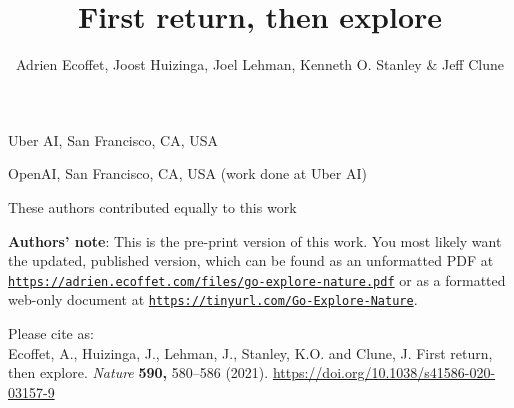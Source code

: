 \documentclass{nature}
\title{First return, then explore}
\author{Adrien Ecoffet, Joost Huizinga, Joel Lehman, Kenneth O. Stanley \& Jeff Clune}
\begin{document}
\maketitle

\begin{affiliations}
 \item Uber AI, San Francisco, CA, USA
 \item OpenAI, San Francisco, CA, USA (work done at Uber AI)

 These authors contributed equally to this work
\end{affiliations}

\vspace{5mm}
\noindent
\textbf{Authors' note}: This is the pre-print version of this work. You most likely want the updated, published version, which can be found as an unformatted PDF at \href{https://adrien.ecoffet.com/files/go-explore-nature.pdf}{\texttt{https://adrien.ecoffet.com/files/go-explore-nature.pdf}} or as a formatted web-only document at \href{https://tinyurl.com/Go-Explore-Nature}{\texttt{https://tinyurl.com/Go-Explore-Nature}}.

\noindent Please cite as:\\
Ecoffet, A., Huizinga, J., Lehman, J., Stanley, K.O. and Clune, J. First return, then explore. \emph{Nature} \textbf{590,} 580–586 (2021). \href{https://doi.org/10.1038/s41586-020-03157-9}{https://doi.org/10.1038/s41586-020-03157-9}
\vspace{15mm}

\ifarxiv
\else
\linenumbers
\fi
\end{document}
